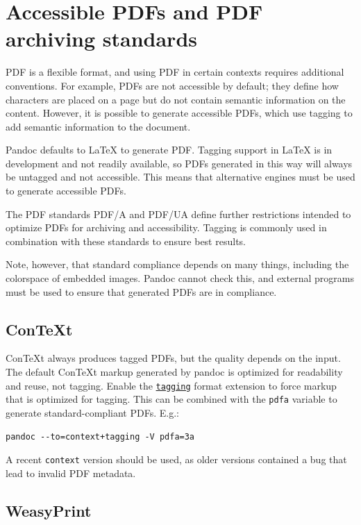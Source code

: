 \documentclass[
  b5paper
]{book}
\begin{document}
\chapter{Accessible PDFs and PDF archiving
standards}\label{accessible-pdfs-and-pdf-archiving-standards}

PDF is a flexible format, and using PDF in certain contexts requires
additional conventions. For example, PDFs are not accessible by default;
they define how characters are placed on a page but do not contain
semantic information on the content. However, it is possible to generate
accessible PDFs, which use tagging to add semantic information to the
document.

Pandoc defaults to LaTeX to generate PDF. Tagging support in LaTeX is in
development and not readily available, so PDFs generated in this way
will always be untagged and not accessible. This means that alternative
engines must be used to generate accessible PDFs.

The PDF standards PDF/A and PDF/UA define further restrictions intended
to optimize PDFs for archiving and accessibility. Tagging is commonly
used in combination with these standards to ensure best results.

Note, however, that standard compliance depends on many things,
including the colorspace of embedded images. Pandoc cannot check this,
and external programs must be used to ensure that generated PDFs are in
compliance.

\section{ConTeXt}\label{context}

ConTeXt always produces tagged PDFs, but the quality depends on the
input. The default ConTeXt markup generated by pandoc is optimized for
readability and reuse, not tagging. Enable the
\hyperref[extension--tagging]{\texttt{tagging}} format extension to
force markup that is optimized for tagging. This can be combined with
the \texttt{pdfa} variable to generate standard-compliant PDFs. E.g.:

\begin{verbatim}
pandoc --to=context+tagging -V pdfa=3a
\end{verbatim}

A recent \texttt{context} version should be used, as older versions
contained a bug that lead to invalid PDF metadata.

\section{WeasyPrint}\label{weasyprint}
\end{document}
